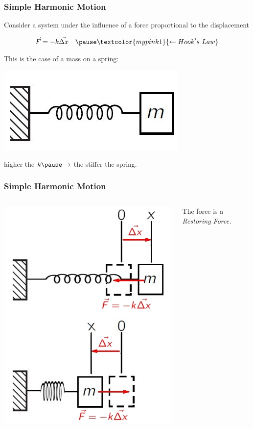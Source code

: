 \documentclass[]{beamer}
\begin{document}


\begin{frame}
\frametitle{Simple Harmonic Motion}

Consider a system under the influence of a force proportional to the displacement 
\pause

\begin{equation}
 \vec{F}=-k\vec{\Delta x}~~~ \pause \textcolor{mypink1}{\leftarrow Hook's~Law}
\end{equation}  
\pause

This is the case of a mass on a spring: 


\begin{center}
  \includegraphics[height=1.in]{images3/spring0.jpg}
\end{center}


 \textcolor{mypink1}{higher}  the $k\pause\rightarrow$ the \textcolor{mypink1}{stiffer}  the spring.

  \end{frame}



  \begin{frame}
    \frametitle{Simple Harmonic Motion}
    
    
    
      \begin{columns}[c]
       \column{2in}  %
      
      \begin{center}
      \includegraphics[height=2.in]{images3/springs.jpg}
    \end{center}
    
       \column{2.4in}
    \pause
    
 The force is a \textcolor{mypink1}{\textit{Restoring Force.}} 
    
       \end{columns}
    
      \end{frame}
\end{document}

